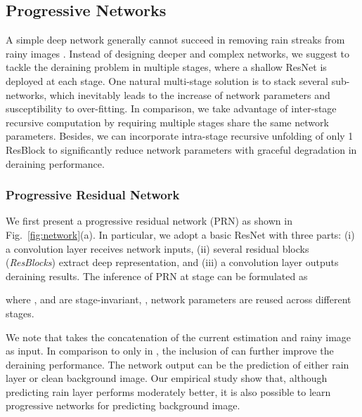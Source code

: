 \documentclass[10pt,twocolumn,letterpaper]{article}
\begin{document}
\subsection{Progressive Networks}
A simple deep network generally cannot succeed in removing rain streaks from rainy images \cite{fu2017clearing,fu2017removing}.
Instead of designing deeper and complex networks, we suggest to tackle the deraining problem in multiple stages, where a shallow ResNet is deployed at each stage.
One natural multi-stage solution is to stack several sub-networks, which inevitably leads to the increase of network parameters and susceptibility to over-fitting.
In comparison, we take advantage of inter-stage recursive computation \cite{kim2016deeply,tai2017image,li2018recurrent} by requiring multiple stages share the same network parameters.
Besides, we can incorporate intra-stage recursive unfolding of only 1 ResBlock to significantly reduce network parameters with graceful degradation in deraining performance.












\vspace{-.1in}
\subsubsection{Progressive Residual Network}



We first present a progressive residual network (PRN) as shown in Fig.~\ref{fig:network}(a).
In particular, we adopt a basic ResNet with three parts: (i) a convolution layer  receives network inputs, (ii) several residual blocks (\emph{ResBlocks})  extract deep representation, and (iii) a convolution layer  outputs deraining results.
The inference of PRN at stage  can be formulated as

where ,  and  are stage-invariant, \ie, network parameters are reused across different stages.


We note that  takes the concatenation of the current estimation  and rainy image  as input.
In comparison to only  in \cite{li2018recurrent}, the inclusion of  can further improve the deraining performance.
The network output can be the prediction of either rain layer or clean background image.
Our empirical study show that, although predicting rain layer performs moderately better, it is also possible to learn progressive networks for predicting background image.
\end{document}
